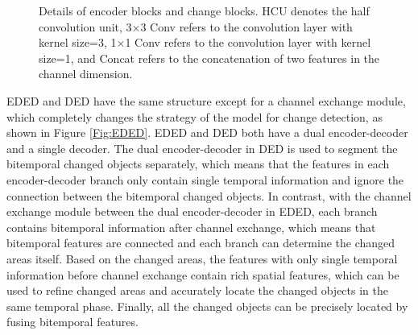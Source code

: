\documentclass[journal]{IEEEtran}
\begin{document}
\begin{figure}[!ht]
 \centering
 \caption{Details of encoder blocks and change blocks. HCU denotes the half convolution unit, 3×3 Conv refers to the convolution layer with kernel size=3, 1×1 Conv refers to the convolution layer with kernel size=1, and Concat refers to the concatenation of two features in the channel dimension.}
 \label{Fig:blocks}
\end{figure}

EDED and DED have the same structure except for a channel exchange module, which completely changes the strategy of the model for change detection, as shown in Figure \ref{Fig:EDED}. EDED and DED both have a dual encoder-decoder and a single decoder. The dual encoder-decoder in DED is used to segment the bitemporal changed objects separately, which means that the features in each encoder-decoder branch only contain single temporal information and ignore the connection between the bitemporal changed objects. In contrast, with the channel exchange module between the dual encoder-decoder in EDED, each branch contains bitemporal information after channel exchange, which means that bitemporal features are connected and each branch can determine the changed areas itself. Based on the changed areas, the features with only single temporal information before channel exchange contain rich spatial features, which can be used to refine changed areas and accurately locate the changed objects in the same temporal phase. Finally, all the changed objects can be precisely located by fusing bitemporal features. 
\end{document}
